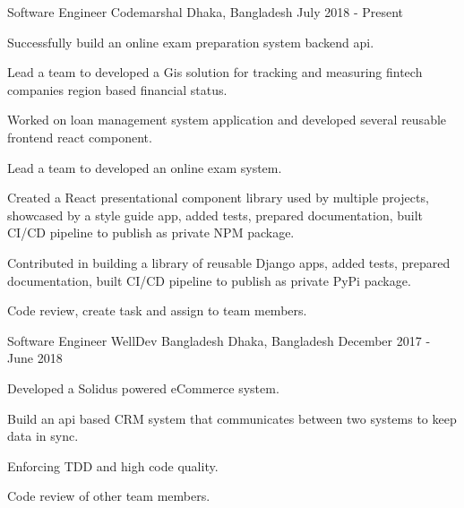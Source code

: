 \begin{cventries}

\cventry
    {Software Engineer}
    {Codemarshal}
    {Dhaka, Bangladesh}
    {July 2018 - Present}
    {
      \begin{cvitemsNumber}[Responsibilities:]
        \item {Successfully build an online exam preparation system backend api.}
        \vspace{1mm}
        \item {Lead a team to developed a Gis solution for tracking and
                measuring fintech companies region based financial status.}
        \vspace{1mm}
        \item {Worked on loan management system application and developed
                several reusable frontend react component.}
        \vspace{1mm}
        \item {Lead a team to developed an online exam system.}
        \vspace{1mm}
        \item {Created a React presentational component library used by multiple
                projects, showcased by a style guide app, added tests, prepared
                documentation, built CI/CD pipeline to publish as private NPM
                package.}
        \vspace{1mm}
        \item {Contributed in building a library of reusable Django apps, added tests, prepared documentation, built CI/CD pipeline to publish as private PyPi package.}
        \vspace{1mm}
        \item {Code review, create task and assign to team members.}
        \vspace{1mm}
      \end{cvitemsNumber}
    }

\cventry
    {Software Engineer}
    {WellDev Bangladesh}
    {Dhaka, Bangladesh}
    {December 2017 - June 2018}
    {
      \begin{cvitemsNumber}[Responsibilities]
        \item {Developed a Solidus powered eCommerce system.}
        \vspace{1mm}
        \item {Build an api based CRM system that communicates between two systems to keep data in sync.}
        \vspace{1mm}
        \item {Enforcing TDD and high code quality.}
        \vspace{1mm}
        \item {Code review of other team members.}
        \vspace{1mm}
      \end{cvitemsNumber}
    }


\end{cventries}
